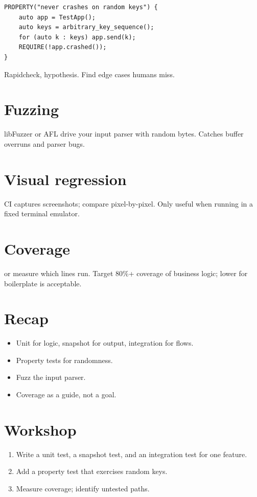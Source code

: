 \begin{lstlisting}
PROPERTY("never crashes on random keys") {
    auto app = TestApp();
    auto keys = arbitrary_key_sequence();
    for (auto k : keys) app.send(k);
    REQUIRE(!app.crashed());
}
\end{lstlisting}

Rapidcheck, hypothesis. Find edge cases humans miss.

\section{Fuzzing}

libFuzzer or AFL drive your input parser with random
bytes. Catches buffer overruns and parser bugs.

\section{Visual regression}

CI captures screenshots; compare pixel-by-pixel. Only
useful when running in a fixed terminal emulator.

\section{Coverage}

 or  measure which lines run.
Target 80\%+ coverage of business logic; lower for
boilerplate is acceptable.

\section{Recap}

\begin{recap}
\begin{itemize}[leftmargin=*]
  \item Unit for logic, snapshot for output, integration
    for flows.
  \item Property tests for randomness.
  \item Fuzz the input parser.
  \item Coverage as a guide, not a goal.
\end{itemize}
\end{recap}

\section*{Workshop}

\begin{enumerate}[leftmargin=*]
  \item Write a unit test, a snapshot test, and an
    integration test for one feature.
  \item Add a property test that exercises random keys.
  \item Measure coverage; identify untested paths.
\end{enumerate}
